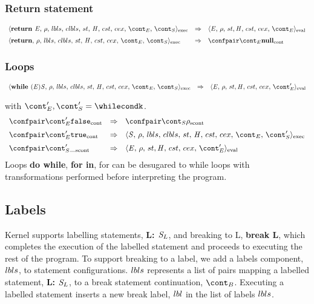 \documentclass{article}
\begin{document}
\subsubsection{Return statement}

\[
  \begin{array}{lcl}
	\execconf{\textbf{return } \expr}{\env}{\lbls}{\clbls}{\handler}{\cstrace}{\cex}{\econt}{\scont}
	& \Rightarrow &
	\evalconf{\expr}{\env}{\strace}{\cstrace}{\cex}{\econt}\\[2mm]
	
	\execconf{\textbf{return}}{\env}{\lbls}{\clbls}{\handler}{\cstrace}{\cex}{\econt}{\scont}
	& \Rightarrow &
	\contconf{\econt}{\textbf{null}}
  \end{array}
\]

\subsubsection{Loops}
\[
  \begin{array}{lcl}
	\execconf{\textbf{while } (\expr) \stmt}{\env}{\lbls}{\clbls}{\handler}{\cstrace}{\cex}{\econt}{\scont}
	& \Rightarrow &
	\evalconf{\expr}{\env}{\strace}{\cstrace}{\cex}{\econt'}\\[2mm]
  \end{array}
\]
with $\econt', \scont' = \whilecondk$.
\[
  \begin{array}{lcl}
	\contconf{\econt'}{\false}
	& \Rightarrow &
	\scontconf{\scont}{\env}\\[2mm]

	\contconf{\econt'}{\true}
	& \Rightarrow &
	\execconf{\stmt}{\env}{\lbls}{\clbls}{\handler}{\cstrace}{\cex}{\econt}{\scont'}\\[2mm]

	\scontconf{\scont'}{\_}
	& \Rightarrow &
	\evalconf{\expr}{\env}{\strace}{\cstrace}{\cex}{\econt'}\\
  \end{array}
\]
Loops \textbf{do while}, \textbf{for in}, for can be desugared to while loops with transformations performed before interpreting the program.

\subsection{Labels}

Kernel supports labelling statements, \textbf{L: $\mathit{S}_{L}$}, and breaking to L, \textbf{break L}, which completes the execution of the labelled statement and proceeds to executing the rest of the program.
To support breaking to a label, we add a labels component, $lbls$, to statement configurations. $lbls$ represents a list of pairs mapping a labelled statement, \textbf{L: $\mathit{S}_L$}, to a break statement continuation, $\bcont$. Executing a labelled statement inserts a new break label, $lbl$ in the list of labels $lbls$.
\end{document}
